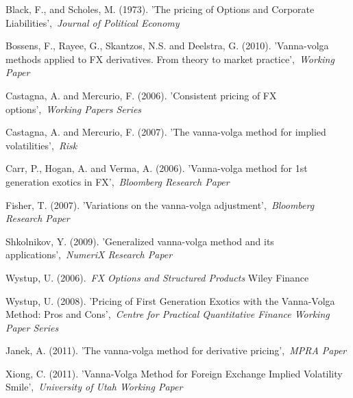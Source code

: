 \cleardoublepage
{}
{}
\begin{thebibliography}{99}

Black, F., and Scholes, M. (1973). 'The pricing of Options and Corporate Liabilities',\ \textit{Journal of Political Economy}

 Bossens, F., Rayee, G., Skantzos, N.S. and Deelstra, G. (2010). 'Vanna-volga methods applied to FX derivatives. From theory to market practice',\ \textit{Working Paper}

 Castagna, A. and Mercurio, F. (2006). 'Consistent pricing of FX options',\ \textit{Working Papers Series}

 Castagna, A. and Mercurio, F. (2007). 'The vanna-volga method for implied volatilities',\ \textit{Risk}

 Carr, P., Hogan, A. and Verma, A. (2006). 'Vanna-volga method for 1st generation exotics
in FX',\ \textit{Bloomberg Research Paper}

 Fisher, T. (2007). 'Variations on the vanna-volga adjustment',\ \textit{Bloomberg Research Paper}

 Shkolnikov, Y. (2009). 'Generalized vanna-volga method and its applications',\ \textit{NumeriX Research Paper}

 Wystup, U. (2006).\ \textit{FX Options and Structured Products} Wiley Finance

 Wystup, U. (2008). 'Pricing of First Generation Exotics with the Vanna-Volga Method: Pros and Cons',\ \textit{Centre for Practical Quantitative Finance Working Paper Series}

 Janek, A. (2011). 'The vanna-volga method for derivative pricing',\ \textit{MPRA Paper} 

 Xiong, C. (2011). 'Vanna-Volga Method for Foreign Exchange Implied Volatility Smile',\ \textit{University of Utah Working Paper} 



\end{thebibliography}

